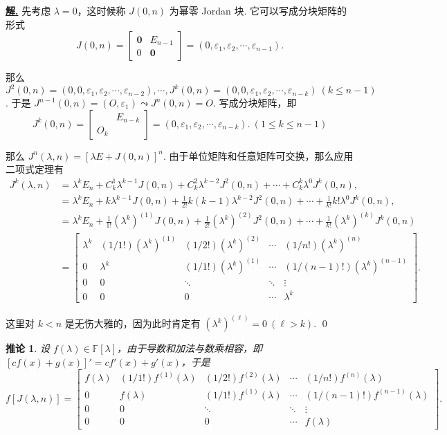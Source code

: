 \documentclass[10pt,openany]{article}
\theoremstyle{thmstyle} %
\theoremstyle{defstyle} %
\newtheorem{corollary}[theorem]{推论}
\theoremstyle{prostyle} %
\theoremstyle{exastyle}
\theoremstyle{remstyle}
\newenvironment{solution}{\par\underline{\textbf{解.}} \;\fangsong}{\qed\par}
\newcommand{\F}{\mathbb{F}}
\begin{document}
\begin{solution}
	先考虑 \( \lambda=0 \)，这时候称 \( J(0,n) \) 为幂零 Jordan 块. 它可以写成分块矩阵的形式
	\[ J(0,n)= \begin{bmatrix}
		\bm{0} & E_{n-1} \\ 0 & \bm{0}
	\end{bmatrix}=(0,\varepsilon_1,\varepsilon_2,\cdots,\varepsilon_{n-1}). \]
	
	那么 \( J^2(0,n)=(0,0,\varepsilon_1,\varepsilon_2,\cdots,\varepsilon_{n-2}),\cdots, J^k(0,n)=(0,0,\varepsilon_1,\varepsilon_2,\cdots,\varepsilon_{n-k}) \ (k \leq n-1) \). 于是 \( J^{n-1}(0,n)=(O,\varepsilon_1) \leadsto J^{n}(0,n)=O \). 写成分块矩阵，即
	\[ J^k(0,n)= \begin{bmatrix}
		 & E_{n-k} \\ O_k & 
	\end{bmatrix}=(0,\varepsilon_1,\varepsilon_2,\cdots,\varepsilon_{n-k}). \ (1 \leq k \leq n-1)\]
	
	那么 \( J^n(\lambda,n)=[\lambda E+J(0,n)]^n \). 由于单位矩阵和任意矩阵可交换，那么应用二项式定理有
	\begin{align*}
		J^k(\lambda,n) &=\lambda^k E_n+ C_k^1\lambda^{k-1}J(0,n)+C_k^2\lambda^{k-2}J^2(0,n)+\cdots+C_k^k\lambda^0J^k(0,n), \\
		&=\lambda^k E_n+ k\lambda^{k-1}J(0,n)+\frac{1}{2!} k(k-1)\lambda^{k-2}J^2(0,n)+\cdots+\frac{1}{k!}k!\lambda^0J^k(0,n), \\
		&=\lambda^k E_n+ \frac{1}{1!}(\lambda^k)^{(1)}J(0,n)+\frac{1}{2!} (\lambda^k)^{(2)}J^2(0,n)+\cdots+\frac{1}{k!}(\lambda^k)^{(k)}J^k(0,n) \\[2ex]
		&= \begin{bmatrix}
			\lambda^k & (1/1!)(\lambda^k)^{(1)} & (1/2!)(\lambda^k)^{(2)} & \cdots & (1/n!)(\lambda^k)^{(n)} \\
			0 & \lambda^k & (1/1!)(\lambda^k)^{(1)} & \cdots &  (1/(n-1)!)(\lambda^k)^{(n-1)} \\
			0 & 0 & \ddots & \ddots &  \vdots \\
			0 & 0 & 0 & \cdots &  \lambda^k 
		\end{bmatrix}.
	\end{align*}
   
   这里对 \( k<n \) 是无伤大雅的，因为此时肯定有 \( (\lambda^k)^{(\ell)}=0 \ ( \ell>k) \).
\end{solution}

\begin{corollary}
	设 \( f(\lambda) \in \F[\lambda] \)，由于导数和加法与数乘相容，即 \( [cf(x)+g(x)]'=cf'(x)+g'(x) \)，于是
	\[ f[J(\lambda,n)]= \begin{bmatrix}
		f(\lambda) & (1/1!)f^{(1)}(\lambda) & (1/2!)f^{(2)}(\lambda) & \cdots & (1/n!)f^{(n)}(\lambda) \\
		0 & f(\lambda) & (1/1!)f^{(1)}(\lambda) & \cdots &  (1/(n-1)!)f^{(n-1)}(\lambda) \\
		0 & 0 & \ddots & \ddots &  \vdots \\
		0 & 0 & 0 & \cdots &  f(\lambda)
	\end{bmatrix}. \] 
\end{corollary}
\end{document}
